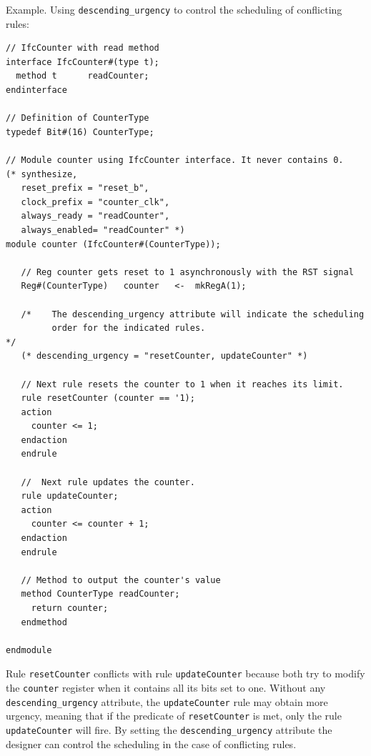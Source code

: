 \documentclass[twoside,letterpaper]{article}
\newcommand{\te}[1]{\texttt{#1}}
\begin{document}
Example.  Using \te{descending\_urgency} to control the scheduling of
conflicting rules:
\begin{verbatim}
// IfcCounter with read method
interface IfcCounter#(type t);
  method t      readCounter;
endinterface

// Definition of CounterType
typedef Bit#(16) CounterType;

// Module counter using IfcCounter interface. It never contains 0.
(* synthesize,
   reset_prefix	= "reset_b",
   clock_prefix	= "counter_clk",
   always_ready	= "readCounter",
   always_enabled= "readCounter" *)
module counter (IfcCounter#(CounterType));

   // Reg counter gets reset to 1 asynchronously with the RST signal         
   Reg#(CounterType)   counter   <-  mkRegA(1);

   /*    The descending_urgency attribute will indicate the scheduling
         order for the indicated rules.                                 */
   (* descending_urgency = "resetCounter, updateCounter" *)

   // Next rule resets the counter to 1 when it reaches its limit.
   rule resetCounter (counter == '1);
   action
     counter <= 1;
   endaction
   endrule

   //  Next rule updates the counter.
   rule updateCounter;
   action
     counter <= counter + 1;
   endaction
   endrule

   // Method to output the counter's value
   method CounterType readCounter;
     return counter;
   endmethod  
 
endmodule
\end{verbatim}
Rule \te{resetCounter} conflicts with rule \te{updateCounter} because
both try  to modify the \te{counter} register when it contains all its bits
set to  one. Without any \te{descending\_urgency} attribute, the
\te{updateCounter} rule may obtain more urgency, meaning that if the
predicate of \te{resetCounter} is met, only the rule
\te{updateCounter} will fire. By setting the \te{descending\_urgency}
attribute the designer can control the scheduling in the  case of
conflicting  rules.


\end{document}
